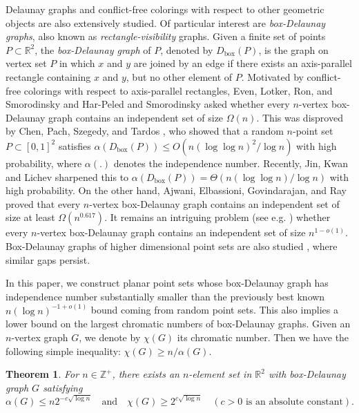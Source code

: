 \documentclass[11pt]{article}
\newtheorem{theorem}{Theorem}
\theoremstyle{definition}
\DeclareMathOperator{\bx}{box}
\begin{document}
Delaunay graphs and conflict-free colorings with respect to other geometric objects are also extensively studied. Of particular interest are \emph{box-Delaunay graphs}, also known as \emph{rectangle-visibility} graphs. Given a finite set of points $P\subset \mathbb{R}^2$, the \emph{box-Delaunay graph} of $P$, denoted by $D_{\bx}(P)$, is the graph on vertex set $P$ in which $x$ and $y$ are joined by an edge if there exists an axis-parallel rectangle containing $x$ and $y$, but no other element of $P$. Motivated by conflict-free colorings with respect to axis-parallel rectangles,  Even, Lotker, Ron, and Smorodinsky \cite{ELRS} and Har-Peled and Smorodinsky \cite{HS} asked whether every $n$-vertex box-Delaunay graph contains an independent set of size $\Omega(n)$. This was disproved by Chen, Pach, Szegedy, and Tardos \cite{CPST}, who showed that a random $n$-point set $P\subset [0,1]^2$ satisfies $\alpha(D_{\bx}(P))\leq O(n(\log \log n)^2/\log n)$ with high probability, where $\alpha(.)$ denotes the independence number. Recently, Jin, Kwan and Lichev \cite{JKL} sharpened this to  $\alpha(D_{\bx}(P))=\Theta(n(\log \log n)/\log n)$ with high probability.  On the other hand, Ajwani, Elbassioni, Govindarajan, and Ray \cite{AEGR} proved that every $n$-vertex box-Delaunay graph contains an independent set of size at least $\Omega(n^{0.617})$. It remains an intriguing problem (see e.g. \cite{CPST}) whether every $n$-vertex box-Delaunay graph contains an independent set of size $n^{1-o(1)}$. Box-Delaunay graphs of higher dimensional point sets are also studied \cite{JKL,Tom24}, where similar gaps persist.

In this paper, we construct planar point sets whose box-Delaunay graph has independence number substantially smaller than the previously best known $n(\log n)^{-1+o(1)}$ bound coming from  random point sets. This also implies a lower bound on the largest chromatic  numbers of box-Delaunay graphs.  Given an $n$-vertex graph $G$, we denote by $\chi(G)$ its chromatic number. Then we have the following simple inequality: $\chi(G)\geq n/\alpha(G)$.

\begin{theorem}\label{thm:main1}
    For $n\in \mathbb{Z}^+$, there exists an $n$-element set in $\mathbb{R}^2$ with box-Delaunay graph $G$ satisfying $$\alpha(G)\leq n2^{-c\sqrt{\log n}}\quad\text{and}\quad\chi(G)\geq 2^{c\sqrt{\log n}}\quad (c>0\text{ is an absolute constant}).$$
\end{theorem}
\end{document}
